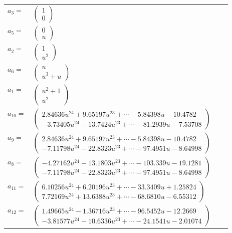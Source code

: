 \documentclass[1p]{elsarticle_modified}
\theoremstyle{definition}
\begin{document}
\begin{tabular}{m{7pt} m{180pt} m{7pt} m{180pt} }
\flushright $a_{3}=$&$\begin{pmatrix}1\\0\end{pmatrix}$ \\
\flushright $a_{5}=$&$\begin{pmatrix}0\\u\end{pmatrix}$ \\
\flushright $a_{2}=$&$\begin{pmatrix}1\\u^2\end{pmatrix}$ \\
\flushright $a_{6}=$&$\begin{pmatrix}u\\u^3+u\end{pmatrix}$ \\
\flushright $a_{1}=$&$\begin{pmatrix}u^2+1\\u^2\end{pmatrix}$ \\
\flushright $a_{10}=$&$\begin{pmatrix}2.84636 u^{24}+9.65197 u^{23}+\cdots-5.84398 u-10.4782\\-3.73405 u^{24}-13.7424 u^{23}+\cdots-81.2939 u-7.53708\end{pmatrix}$ \\
\flushright $a_{9}=$&$\begin{pmatrix}2.84636 u^{24}+9.65197 u^{23}+\cdots-5.84398 u-10.4782\\-7.11798 u^{24}-22.8323 u^{23}+\cdots-97.4951 u-8.64998\end{pmatrix}$ \\
\flushright $a_{8}=$&$\begin{pmatrix}-4.27162 u^{24}-13.1803 u^{23}+\cdots-103.339 u-19.1281\\-7.11798 u^{24}-22.8323 u^{23}+\cdots-97.4951 u-8.64998\end{pmatrix}$ \\
\flushright $a_{11}=$&$\begin{pmatrix}6.10256 u^{24}+6.20196 u^{23}+\cdots-33.3409 u+1.25824\\7.72169 u^{24}+13.6388 u^{23}+\cdots-68.6810 u-6.55312\end{pmatrix}$ \\
\flushright $a_{12}=$&$\begin{pmatrix}1.49665 u^{24}-1.36716 u^{23}+\cdots-96.5452 u-12.2669\\-3.81577 u^{24}-10.6336 u^{23}+\cdots-24.1541 u-2.01074\end{pmatrix}$ \\

\end{tabular}
\end{document}

